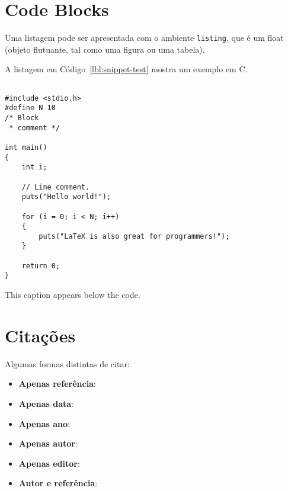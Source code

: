 \section{Code Blocks}
Uma listagem pode ser apresentada com o ambiente \texttt{listing}, que é um float (objeto flutuante, tal como uma figura ou uma tabela).

A listagem em Código~\ref{lbl:snippet-test} mostra um exemplo em C.

\begin{listing}[h]
\begin{verbatim}

#include <stdio.h>
#define N 10
/* Block
 * comment */
 
int main()
{
    int i;
 
    // Line comment.
    puts("Hello world!");
 
    for (i = 0; i < N; i++)
    {
        puts("LaTeX is also great for programmers!");
    }
 
    return 0;
}
\end{verbatim}
\caption{This caption appears below the code.}
\label{lbl:snippet-test}
\end{listing}


\section{Citações}

Algumas formas distintas de citar:

\begin{itemize}
    \item \textbf{Apenas referência}:~\cite{rfc44}
    \item \textbf{Apenas data}:~
    \item \textbf{Apenas ano}:~\citeyear{rfc44}
    \item \textbf{Apenas autor}:~\citeauthor{rfc44}
    \item \textbf{Apenas editor}:
    \item \textbf{Autor e referência}:\citet{rfc44}
\end{itemize}
